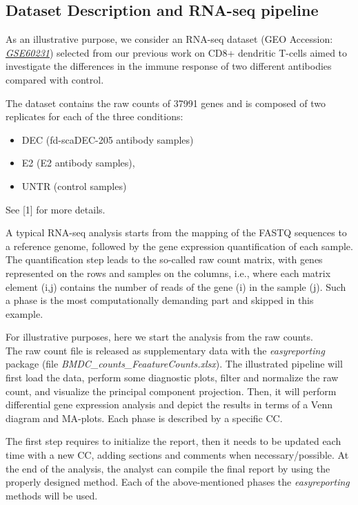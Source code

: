 \documentclass[]{article}
\begin{document}
\hypertarget{dataset-description-and-rna-seq-pipeline}{%
\subsection{Dataset Description and RNA-seq
pipeline}\label{dataset-description-and-rna-seq-pipeline}}

As an illustrative purpose, we consider an RNA-seq dataset (GEO
Accession:
\href{https://www.ncbi.nlm.nih.gov/geo/query/acc.cgi?acc=GSE60231}{\emph{GSE60231}})
selected from our previous work on CD8+ dendritic T-cells aimed to
investigate the differences in the immune response of two different
antibodies compared with control.

The dataset contains the raw counts of 37991 genes and is composed of
two replicates for each of the three conditions:

\begin{itemize}
\item
  DEC (fd-scaDEC-205 antibody samples)
\item
  E2 (E2 antibody samples),
\item
  UNTR (control samples)
\end{itemize}

See {[}1{]} for more details.

A typical RNA-seq analysis starts from the mapping of the FASTQ
sequences to a reference genome, followed by the gene expression
quantification of each sample. The quantification step leads to the
so-called raw count matrix, with genes represented on the rows and
samples on the columns, i.e., where each matrix element (i,j) contains
the number of reads of the gene (i) in the sample (j). Such a phase is
the most computationally demanding part and skipped in this example.

For illustrative purposes, here we start the analysis from the raw
counts.\\
The raw count file is released as supplementary data with the
\emph{easyreporting} package (file
\emph{BMDC\_counts\_FeaatureCounts.xlsx}). The illustrated pipeline will
first load the data, perform some diagnostic plots, filter and normalize
the raw count, and visualize the principal component projection. Then,
it will perform differential gene expression analysis and depict the
results in terms of a Venn diagram and MA-plots. Each phase is described
by a specific CC.

The first step requires to initialize the report, then it needs to be
updated each time with a new CC, adding sections and comments when
necessary/possible. At the end of the analysis, the analyst can compile
the final report by using the properly designed method. Each of the
above-mentioned phases the \emph{easyreporting} methods will be used.
\end{document}

